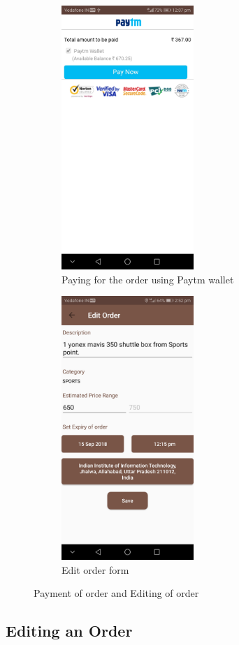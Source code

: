 \documentclass{report}
\begin{document}
\begin{figure}[h!]
\begin{subfigure}[h!]{.3\textwidth}
\centering
\includegraphics[width=5cm]{paytm_pay.jpg}
\caption{\centering Paying for the order using Paytm wallet}
\end{subfigure}
\begin{subfigure}[h!]{.3\textwidth}
\centering
\includegraphics[width=5cm]{edit_order.jpg}
\caption{\centering Edit order form}
\end{subfigure}
\caption{Payment of order and Editing of order} 
\label{fig:NASA_Logo}
\end{figure}
\pagebreak
\pagebreak
\subsection{Editing an Order}
\end{document}
